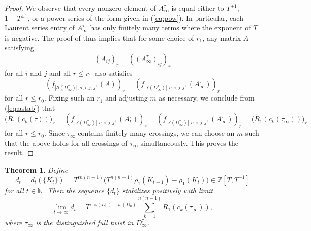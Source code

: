 \documentclass[11pt,hyp,]{nyjm}
\newcommand{\Z}{\mathbb{Z}}
\newcommand{\N}{\mathbb{N}}
\newtheorem{thm}{Theorem}
\numberwithin{thm}{section}
\theoremstyle{definition}
\theoremstyle{remark}
\begin{document}
\begin{proof}
		We observe that every nonzero element of $A^\tau_\infty$ is equal either to $T^{\pm 1}$, $1 - T^{\pm 1}$, or a power series of the form given in (\ref{eq:pow}). In particular, each Laurent series entry of $A^\tau_\infty$ has only finitely many terms where the exponent of $T$ is negative. The proof of  thus implies that for some choice of $r_1$, any matrix $A$ satisfying
		$$
		(A_{ij})_r = ((A^\tau_\infty)_{ij})_r
		$$
		for all $i$ and $j$ and all $r \leq r_1$ also satisfies
		$$
		(f_{|\mathcal{S}(D^\tau_\infty)|, \sigma, i , j, j^+}(A))_r = (f_{|\mathcal{S}(D^\tau_\infty)|, \sigma, i , j, j^+}(A^\tau_\infty))_r
		$$
		for all $r \leq r_0$. Fixing such an $r_1$ and adjusting $m$ as necessary, we conclude from (\ref{eq:astab}) that
		$$
		\big(\widetilde{R}_1(c_k(\tau))\big)_r = (f_{|\mathcal{S}(D^\tau_\infty)|, \sigma, i , j, j^+}(A^\tau_t))_r = (f_{|\mathcal{S}(D^\tau_\infty)|, \sigma, i , j, j^+}(A^\tau_\infty))_r = \big(\widetilde{R}_1(c_k(\tau_\infty))\big)_r
		$$
		for all $r \leq r_0$. Since $\tau_\infty$ contains finitely many crossings, we can choose an $m$ such that the above holds for all crossings of $\tau_\infty$ simultaneously. This proves the result.
	\end{proof}

	\begin{thm}
		\label{prop:main}
		Define
		$$
		d_t = d_t(\{K_t\}) = T^{tn(n - 1)} \Big( T^{n(n - 1)}\rho_1(K_{t + 1}) - \rho_1(K_t) \Big) \in \Z[T,T^{-1}]
		$$
		for all $t \in \N$. Then the sequence $\{d_t\}$ stabilizes positively with limit
		$$
		\lim_{t \to \infty} d_t = T^{-\varphi(D_0) -w(D_0)} \sum_{k = 1}^{n(n - 1)} \widetilde{R}_1(c_k(\tau_\infty)),
		$$
		where $\tau_\infty$ is the distinguished full twist in $D^\tau_\infty$.
	\end{thm}
\end{document}
